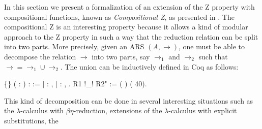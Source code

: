     In this section we present a formalization of an extension of the
    Z property with compositional functions, known as \textit{Compositional
    Z}, as presented in \cite{Nakazawa-Fujita2016}. The
    compositional Z is an interesting property because it allows a
    kind of modular approach to the Z property in such a way that the
    reduction relation can be split into two parts. More precisely,
    given an ARS $(A,\to)$, one must be able to decompose the relation
    $\to$ into two parts, say $\to_1$ and $\to_2$ such that $\to =
    \to_1\cup \to_2$. The union can be inductively defined in
    Coq as follows: \begin{coqdoccode}
\coqdocemptyline
\coqdocnoindent
{}  \{\} ( :  ) :   := \ensuremath{|} : \coqdockw{\ensuremath{\forall}}  ,          \ensuremath{|} : \coqdockw{\ensuremath{\forall}}  ,         .\coqdoceol
\coqdocemptyline
\coqdocnoindent
{} R1 !\_! R2" := (  ) (  40).\coqdoceol
\coqdocemptyline
\end{coqdoccode}
This kind of decomposition can be done in several interesting
situations such as the $\lambda$-calculus with
$\beta\eta$-reduction\cite{Ba84}, extensions of the
$\lambda$-calculus with explicit substitutions\cite{accl91}, the
